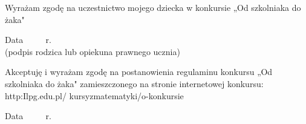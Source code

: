 \documentclass[10pt]{article}
\begin{document}
Wyrażam zgodę na uczestnictwo mojego dziecka w konkursie „Od szkolniaka do żaka"

Data \(\qquad\) r.\\
(podpis rodzica lub opiekuna prawnego ucznia)

Akceptuję i wyrażam zgodę na postanowienia regulaminu konkursu „Od szkolniaka do żaka" zamieszczonego na stronie internetowej konkursu: http:Ilpg.edu.pl/ kursyzmatematyki/o-konkursie

Data \(\qquad\) r.
\end{document}
